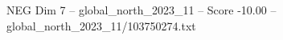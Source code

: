 \begin{textsample}{NEG Dim 7 – global\_north\_2023\_11 – Score -10.00 – global\_north\_2023\_11/103750274.txt}
\end{textsample}
